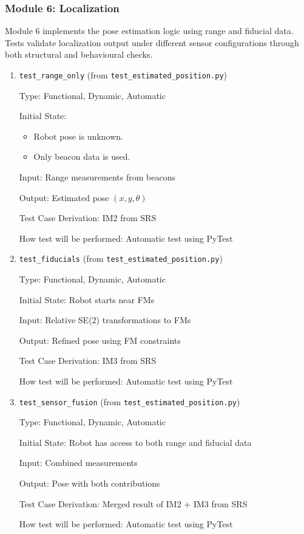 \documentclass[12pt, titlepage]{article}
\begin{document}
\subsubsection{Module 6: Localization}

Module 6 implements the pose estimation logic using range and fiducial data. Tests validate localization output under different sensor configurations through both structural and behavioural checks.

\begin{enumerate}
  \item{\texttt{test\_range\_only} (from \texttt{test\_estimated\_position.py})}

  Type: Functional, Dynamic, Automatic
            
  Initial State:  
  \begin{itemize}
    \item Robot pose is unknown.
    \item Only beacon data is used.
  \end{itemize}
            
  Input: Range measurements from beacons
            
  Output: Estimated pose $(x, y, \theta)$
  
  Test Case Derivation: IM2 from SRS
  
  How test will be performed: Automatic test using PyTest
            
  \item{\texttt{test\_fiducials} (from \texttt{test\_estimated\_position.py})}
  
  Type: Functional, Dynamic, Automatic
            
  Initial State: Robot starts near FMs
            
  Input: Relative SE(2) transformations to FMs
            
  Output: Refined pose using FM constraints
  
  Test Case Derivation: IM3 from SRS
  
  How test will be performed: Automatic test using PyTest
  
  \item{\texttt{test\_sensor\_fusion} (from \texttt{test\_estimated\_position.py})}
  
  Type: Functional, Dynamic, Automatic
            
  Initial State: Robot has access to both range and fiducial data
            
  Input: Combined measurements
            
  Output: Pose with both contributions
  
  Test Case Derivation: Merged result of IM2 + IM3 from SRS
  
  How test will be performed: Automatic test using PyTest
\end{enumerate}
\end{document}
